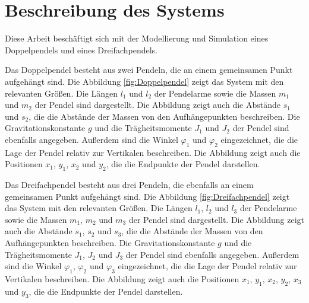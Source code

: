 \chapter{Beschreibung des Systems}\label{ch:Systembeschreibung}
Diese Arbeit beschäftigt sich mit der Modellierung und Simulation eines Doppelpendels und eines Dreifachpendels. 

Das Doppelpendel besteht aus zwei Pendeln, die an einem gemeinsamen Punkt aufgehängt sind. Die Abbildung \ref{fig:Doppelpendel} zeigt das System mit den relevanten Größen. Die Längen $l_1$ und $l_2$ der Pendelarme sowie die Massen $m_1$ und $m_2$ der Pendel sind dargestellt. Die Abbildung zeigt auch die Abstände $s_1$ und $s_2$, die die Abstände der Massen von den Aufhängepunkten beschreiben. Die Gravitationskonstante $g$ und die Trägheitsmomente $J_1$ und $J_2$ der Pendel sind ebenfalls angegeben. Außerdem sind die Winkel $\varphi_1$ und $\varphi_2$ eingezeichnet, die die Lage der Pendel relativ zur Vertikalen beschreiben. Die Abbildung zeigt auch die Positionen $x_1$, $y_1$, $x_2$ und $y_2$, die die Endpunkte der Pendel darstellen. 

Das Dreifachpendel besteht aus drei Pendeln, die ebenfalls an einem gemeinsamen Punkt aufgehängt sind. Die Abbildung \ref{fig:Dreifachpendel} zeigt das System mit den relevanten Größen. Die Längen $l_1$, $l_2$ und $l_3$ der Pendelarme sowie die Massen $m_1$, $m_2$ und $m_3$ der Pendel sind dargestellt. Die Abbildung zeigt auch die Abstände $s_1$, $s_2$ und $s_3$, die die Abstände der Massen von den Aufhängepunkten beschreiben. Die Gravitationskonstante $g$ und die Trägheitsmomente $J_1$, $J_2$ und $J_3$ der Pendel sind ebenfalls angegeben. Außerdem sind die Winkel $\varphi_1$, $\varphi_2$ und $\varphi_3$ eingezeichnet, die die Lage der Pendel relativ zur Vertikalen beschreiben. Die Abbildung zeigt auch die Positionen $x_1$, $y_1$, $x_2$, $y_2$, $x_3$ und $y_3$, die die Endpunkte der Pendel darstellen.

